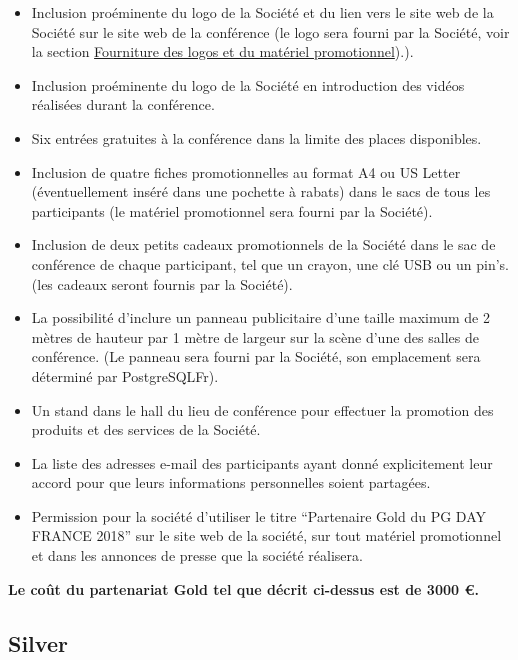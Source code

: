 \documentclass[]{article}
\begin{document}
\begin{itemize}
\item
  Inclusion proéminente du logo de la Société et du lien vers le site
  web de la Société sur le site web de la conférence (le logo sera
  fourni par la Société, voir la section
  \protect\hyperlink{fourniture-des-logos-et-du-matuxe9riel-promotionnel}{Fourniture
  des logos et du matériel promotionnel}).).
\item
  Inclusion proéminente du logo de la Société en introduction des vidéos
  réalisées durant la conférence.
\item
  Six entrées gratuites à la conférence dans la limite des places
  disponibles.
\item
  Inclusion de quatre fiches promotionnelles au format A4 ou US Letter
  (éventuellement inséré dans une pochette à rabats) dans le sacs de
  tous les participants (le matériel promotionnel sera fourni par la
  Société).
\item
  Inclusion de deux petits cadeaux promotionnels de la Société dans le
  sac de conférence de chaque participant, tel que un crayon, une clé
  USB ou un pin's. (les cadeaux seront fournis par la Société).
\item
  La possibilité d'inclure un panneau publicitaire d'une taille maximum
  de 2 mètres de hauteur par 1 mètre de largeur sur la scène d'une des
  salles de conférence. (Le panneau sera fourni par la Société, son
  emplacement sera déterminé par PostgreSQLFr).
\item
  Un stand dans le hall du lieu de conférence pour effectuer la
  promotion des produits et des services de la Société.
\item
  La liste des adresses e-mail des participants ayant donné
  explicitement leur accord pour que leurs informations personnelles
  soient partagées.
\item
  Permission pour la société d'utiliser le titre ``Partenaire Gold du PG
  DAY FRANCE 2018'' sur le site web de la société, sur tout matériel
  promotionnel et dans les annonces de presse que la société réalisera.
\end{itemize}

\textbf{Le coût du partenariat Gold tel que décrit ci-dessus est de 3000
€.}

\hypertarget{silver}{%
\subsection{Silver}\label{silver}}
\end{document}
